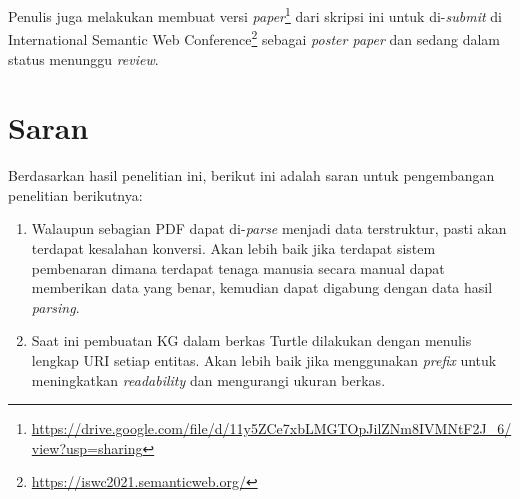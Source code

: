 Penulis juga melakukan membuat versi
\textit{paper}\footnote{\url{https://drive.google.com/file/d/11y5ZCe7xbLMGTOpJilZNm8IVMNtF2J_6/view?usp=sharing}}
dari skripsi ini untuk di-\textit{submit} di International Semantic Web
Conference\footnote{\url{https://iswc2021.semanticweb.org/}} sebagai \textit{poster paper} dan
sedang dalam status menunggu \textit{review}.

\section{Saran}
\label{sec:saran}
Berdasarkan hasil penelitian ini, berikut ini adalah saran untuk pengembangan penelitian berikutnya:
\begin{enumerate}
	\item Walaupun sebagian PDF dapat di-\textit{parse} menjadi data terstruktur, pasti akan terdapat
	      kesalahan konversi. Akan lebih baik jika terdapat sistem pembenaran dimana terdapat tenaga
	      manusia secara manual dapat memberikan data yang benar, kemudian dapat digabung dengan data
	      hasil \textit{parsing}.
	\item Saat ini pembuatan KG dalam berkas Turtle dilakukan dengan menulis lengkap URI setiap
	      entitas. Akan lebih baik jika menggunakan \textit{prefix} untuk meningkatkan \textit{readability}
	      dan mengurangi ukuran berkas.
\end{enumerate}
